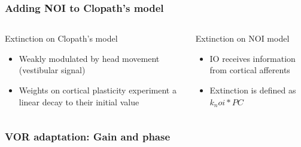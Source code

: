 \documentclass[10pt, compress]{beamer}
\begin{document}
\begin{frame}[fragile]
  \frametitle{Adding NOI to Clopath's model}
  \begin{columns}[T]
    \begin{column}[T]{5cm}
      Extinction on Clopath's model
      \begin{itemize}
        \item Weakly modulated by head movement (vestibular signal)
        \item Weights on cortical plasticity experiment a linear decay to their initial value
      \end{itemize}
    \end{column}
    \begin{column}[T]{5cm}
      Extinction on NOI model
      \begin{itemize}
        \item IO receives information from cortical afferents \cite{Najac2015}
        \item Extinction is defined as $k_noi*PC$
      \end{itemize}
    \end{column}
  \end{columns}
\end{frame}


\begin{frame}[fragile]
  \frametitle{VOR adaptation: Gain and phase}
\end{frame}
\end{document}
